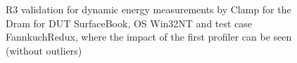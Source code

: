\begin{figure}
                            \caption{R3 validation for dynamic energy measurements by Clamp for the Dram for DUT SurfaceBook, OS Win32NT and test case FannkuchRedux, where the impact of the first profiler can be seen (without outliers)} \label{fig:SurfaceBook_Clamp_Dram_R3_dynamic_energy_without_outliers_Win32NT_avg_watts}
                            \end{figure}
                            